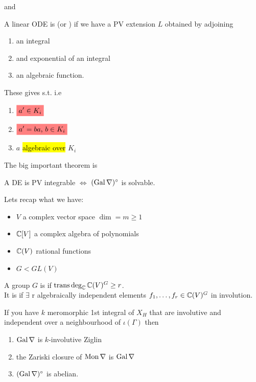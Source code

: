 \documentclass{article}
\begin{document}
and 
\begin{definition}
A linear ODE is  (or ) if we have a PV extension $L$ obtained by adjoining 
\begin{enumerate}
    \item an integral 
    \item and exponential of an integral 
    \item an algebraic function. 
\end{enumerate}
These gives 
s.t. 
i.e 
\begin{enumerate}
    \item $\highlight{a^\prime \in K_i}$
    \item $\highlight{a^\prime = ba$, $b \in K_i}$
    \item $a$ \hl{algebraic over} $K_i$
\end{enumerate}
\end{definition}

The big important theorem is 

\begin{theorem}
A DE is PV integrable $\Leftrightarrow$ $(\operatorname{Gal} \nabla)^\circ$ is solvable. 
\end{theorem}

Lets recap what we have:
\begin{itemize}
    \item $V$ a complex vector space $\dim =m\geq 1$
    \item $\mathbb{C}[V]$ a complex algebra of polynomials
    \item $\mathbb{C}(V)$ rational functions
    \item $G < GL(V)$
\end{itemize}

\begin{definition}
A group $G$ is  if $\operatorname{trans}\deg_{\mathbb{C}} \mathbb{C}(V)^G \geq r$. \\
It is  if $\exists$ r algebraically independent elements $f_1, \dots, f_r \in \mathbb{C}(V)^G$ in involution. 
\end{definition}

\begin{theorem}[Ziglin]
If you have $k$ meromorphic 1st integral of $X_H$ that are involutive and independent over a neighbourhood of $\iota(\Gamma)$ then 
\begin{enumerate}
    \item $\operatorname{Gal}\nabla$ is $k$-involutive Ziglin
    \item the Zariski closure of $\operatorname{Mon}\nabla$ is $\operatorname{Gal}\nabla$
    \item $(\operatorname{Gal}\nabla)^\circ$ is abelian. 
\end{enumerate}
\end{theorem}
\end{document}
